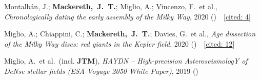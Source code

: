 \item[{\scriptsize3}]Montalb{\'a}n, J.; \textbf{Mackereth,~J.~T.}; Miglio, A.; Vincenzo, F.~et al., \textit{Chronologically dating the early assembly of the Milky Way}, 2020 ()~~{\footnotesize[\href{http://adsabs.harvard.edu/abs/2020arXiv200601783M}{cited: 4}]}

\item[{\scriptsize2}]Miglio, A.; Chiappini, C.; \textbf{Mackereth,~J.~T.}; Davies, G.~et al., \textit{Age dissection of the Milky Way discs: red giants in the Kepler field}, 2020 ()~~{\footnotesize[\href{http://adsabs.harvard.edu/abs/2020arXiv200414806M}{cited: 12}]}

\item[{\scriptsize1}]Miglio, A.~et al.~(incl. \textbf{JTM}), \textit{HAYDN -- High-precision AsteroseismologY of DeNse stellar fields (ESA Voyage 2050 White Paper)}, 2019 ()